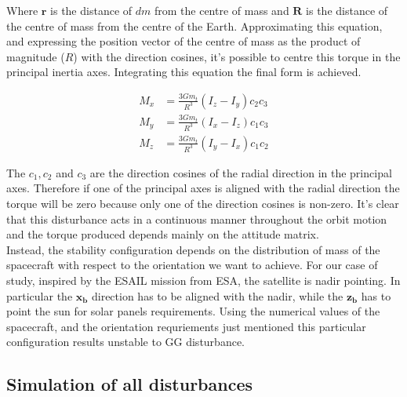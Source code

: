 Where \( \mathbf{r} \) is the distance of \( dm \) from the centre of mass and \( \mathbf{R} \) is the distance of the centre of mass from the centre of the Earth. 
Approximating this equation, and expressing the position vector of the centre of mass as the product of magnitude (\( R \)) with the direction cosines, 
it’s possible to centre this torque in the principal inertia axes. Integrating this equation the final form is achieved.

\begin{align*}
	M_x &= \frac{3Gm_t}{R^3} (I_z - I_y)c_2c_3 \\
	M_y &= \frac{3Gm_t}{R^3} (I_x - I_z)c_1c_3 \\
	M_z &= \frac{3Gm_t}{R^3} (I_y - I_x)c_1c_2
\end{align*}

The \( c_1, c_2 \) and \( c_3 \) are the direction cosines of the radial direction in the principal axes. 
Therefore if one of the principal axes is aligned with the radial direction the torque will be zero because only one of the direction cosines is non-zero.
It's clear that this disturbance acts in a continuous manner throughout the orbit motion and the torque produced depends mainly on the attitude matrix.\\
Instead, the stability configuration depends on the distribution of mass of the spacecraft with respect to the orientation we want to achieve. For our case of study, 
inspired by the ESAIL mission from ESA, the satellite is nadir pointing. In particular the $\boldsymbol{x_b}$ direction has to be aligned with the nadir, while the
$\boldsymbol{z_b}$ has to point the sun for solar panels requirements. Using the numerical values of the spacecraft, and the orientation requriements just mentioned
this particular configuration results unstable to GG disturbance.

\subsection{Simulation of all disturbances}
\label{subsec:sim_disturbances}


